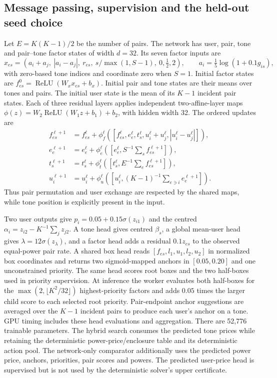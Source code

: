 \documentclass[10pt,letterpaper]{article}
\begin{document}
\subsection{Message passing, supervision and the held-out seed choice}
Let \(E=K(K-1)/2\) be the number of pairs.
The network has user, pair, tone and pair--tone factor states of width
\(d=32\). Its seven factor inputs are
\[
 x_{es}=(a_i+a_j,\ |a_i-a_j|,\ r_{es},\
        s/\max(1,S-1),\ 0,\tfrac12,2),\qquad
 a_i=\tfrac15\log(1+0.1g_{is}),
\]
with zero-based tone indices and coordinate zero when \(S=1\). Initial factor states are
\(f^0_{es}=\operatorname{ReLU}(W_xx_{es}+b_x)\).
Initial pair and tone states are their means over tones and pairs.
The initial user state is the mean of its \(K-1\) incident pair states.
Each of three residual layers applies independent two-affine-layer maps
\(\phi(z)=W_2\operatorname{ReLU}(W_1z+b_1)+b_2\), with hidden width 32.
The ordered updates are
\begin{align*}
 f^{\ell+1}_{es}&=f^\ell_{es}+
 \phi_f^\ell([f^\ell_{es},e^\ell_e,t^\ell_s,
                         u^\ell_i+u^\ell_j,|u^\ell_i-u^\ell_j|]),\\
 e^{\ell+1}_e&=e^\ell_e+
 \phi_e^\ell([e^\ell_e,S^{-1}\textstyle\sum_s f^{\ell+1}_{es}]),\\
 t^{\ell+1}_s&=t^\ell_s+
 \phi_t^\ell([t^\ell_s,E^{-1}\textstyle\sum_e f^{\ell+1}_{es}]),\\
 u^{\ell+1}_i&=u^\ell_i+
 \phi_u^\ell([u^\ell_i,(K-1)^{-1}\textstyle\sum_{e\ni i}e^{\ell+1}_e]).
\end{align*}
Thus pair permutation and user exchange are respected by the shared maps,
while tone position is explicitly present in the input.

Two user outputs give \(p_i=0.05+0.15\sigma(z_{i1})\) and the centred
\(\alpha_i=z_{i2}-K^{-1}\sum_jz_{j2}\).
A tone head gives centred \(\beta_s\), a global mean-user head gives
\(\lambda=12\sigma(z_\lambda)\), and a factor head adds a residual
\(0.1z_{es}\) to the observed equal-power pair rate.
A shared box head reads \([f_{es},l_1,u_1,l_2,u_2]\) in normalized box
coordinates and returns two sigmoid-mapped anchors in \([0.05,0.20]\)
and one unconstrained priority. The same head scores root boxes and
the two half-boxes used in priority supervision. At inference the worker
evaluates both half-boxes for the \(\max(2,\lfloor K^2/32\rfloor)\)
highest-priority factors and adds \(0.05\) times the larger child score
to each selected root priority. Pair-endpoint anchor suggestions are
averaged over the \(K-1\) incident pairs to produce each user's anchor
on a tone. GPU timing includes these head evaluations and aggregation.
There are 52,776 trainable
parameters. The hybrid search consumes the predicted tone prices
while retaining the deterministic power-price/enclosure table and its deterministic
action pool. The network-only comparator additionally uses the predicted
power price, anchors, priorities, pair scores and powers.
The predicted user-price head is supervised but is not used by the
deterministic solver's upper certificate.
\end{document}
